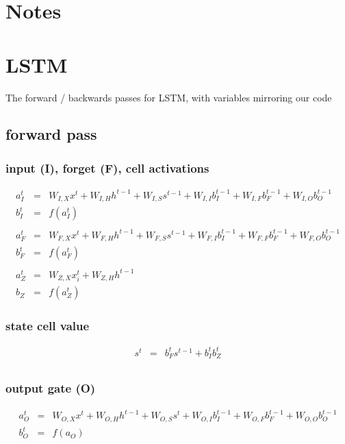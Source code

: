 \documentclass{article}
\begin{document}
\section{Notes}

\section{LSTM}
The forward / backwards passes for LSTM, with variables mirroring our code

\subsection{forward pass}

\subsubsection{input (I), forget (F), cell activations}

\begin{eqnarray*}
a_{I}^t &=& W_{I,X}x^t + W_{I,H}h^{t-1}+W_{I,S}s^{t-1} + W_{I,I}b_{I}^{t-1} + W_{I,F}b_{F}^{t-1} + W_{I,O}b_{O}^{t-1}\\
b_{I}^t &=& f(a_{I}^t) \\
\\
a_{F}^t &=& W_{F, X}x^t + W_{F, H}h^{t-1}+W_{F, S}s^{t-1} + W_{F,I}b_{I}^{t-1} + W_{F,F}b_{F}^{t-1} + W_{F,O}b_{O}^{t-1}\\
b_{F}^t &=& f(a_{F}^t) \\
\\
a_{Z}^t &=& W_{Z,X}x_i^t + W_{Z,H} h^{t-1} \\
b_{Z} &=& f(a_{Z}^t) 
\end{eqnarray*}

\subsubsection{state cell value}
\begin{eqnarray*}
s^t &=& b_{F}^ts^{t-1} + b_{I}^t b_Z^t \\  
\end{eqnarray*}

\subsubsection{output gate (O)}
\begin{eqnarray*}
a_{O}^t &=& W_{O,X}x^t + W_{O,H}h^{t-1} + W_{O,S}s^t + W_{O,I}b_{I}^{t-1} + W_{O,F}b_{F}^{t-1} + W_{O,O}b_{O}^{t-1}\\
b_{O}^t &=& f(a_{O}) \\
\end{eqnarray*}
\end{document}
